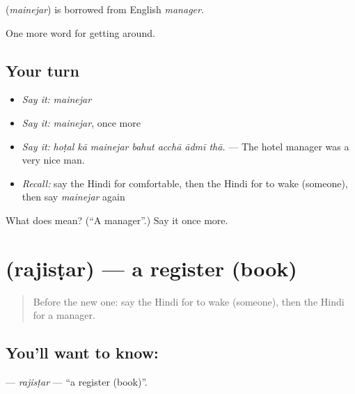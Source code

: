 \begin{cousinweb}
\textbf{} (\emph{mainejar}) is borrowed from English \emph{manager}.
\end{cousinweb}

\begin{grammarlens}[title={What you've built}]
One more word for getting around.
\end{grammarlens}

\subsection*{Your turn}
\begin{itemize}
\raggedright
  \item \emph{Say it:} \emph{mainejar}
  \item \emph{Say it:} \emph{mainejar}, once more
  \item \emph{Say it:} \emph{hoṭal kā mainejar bahut acchā ādmī thā.} — The hotel manager was a very nice man.
  \item \emph{Recall:} say the Hindi for comfortable, then the Hindi for to wake (someone), then say \emph{mainejar} again
\end{itemize}

\begin{tcolorbox}[breakable,colback=teal!4,colframe=teal!35!black,title={Before you move on}]
What does  mean? (\textquotedblleft{}A manager\textquotedblright{}.) Say it once more.
\end{tcolorbox}
\section[\texorpdfstring{\hi{रजिस्टर} (rajisṭar)}{रजिस्टर (rajisṭar)}]{ (rajisṭar) — a register (book)}

\label{lesson:HI-C415-rajistar}



\begin{quote}
Before the new one: say the Hindi for to wake (someone), then the Hindi for a manager.
\end{quote}

\subsection*{You'll want to know: }
\textbf{} — \emph{rajisṭar} — \textquotedblleft{}a register (book)\textquotedblright{}.

\begin{quote}
      
\end{quote}


